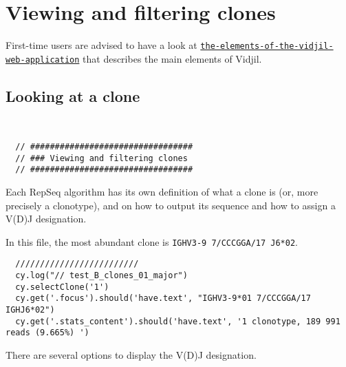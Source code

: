 \section{Viewing and filtering clones}

First-time users are advised to have a look at \href{https://www.vidjil.org/doc/user/#the-elements-of-the-vidjil-web-application}{\tt the-elements-of-the-vidjil-web-application} that describes the main elements of Vidjil.

\subsection{Looking at a clone}
\begin{verbatim}


  // #################################
  // ### Viewing and filtering clones
  // #################################

\end{verbatim}


Each RepSeq algorithm has its own definition of what a clone is (or, more precisely
a clonotype), and on how to output its sequence and how to assign a V(D)J designation.

In this file, the most abundant clone
is \texttt{IGHV3-9 7/CCCGGA/17 J6*02}.



\begin{verbatim}
  /////////////////////////
  cy.log("// test_B_clones_01_major")
  cy.selectClone('1')
  cy.get('.focus').should('have.text', "IGHV3-9*01 7/CCCGGA/17 IGHJ6*02")
  cy.get('.stats_content').should('have.text', '1 clonotype, 189 991 reads (9.665%) ')

\end{verbatim}


There are several options to display the V(D)J designation.


